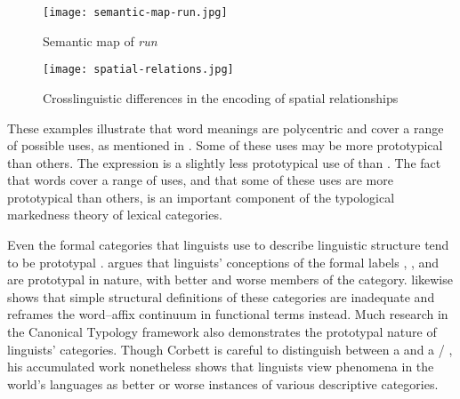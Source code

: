 \clearpage
  \begin{figure}[h!]
    \texttt{[image: semantic-map-run.jpg]}
    \caption[Semantic map of English \textit{run}]{Semantic map of  \textit{run} \parencite[74]{Gries2006}}
    \label{fig:semantic-map-run}
  \end{figure}
\clearpage

\begin{figure}[h!]
  \texttt{[image: spatial-relations.jpg]}
  \caption[Crosslinguistic differences in the encoding of spatial relationships]{Crosslinguistic differences in the encoding of spatial relationships \parencite[485]{BowermanChoi2001}}
  \label{fig:spatial-relations}
\end{figure}

These examples illustrate that word meanings are polycentric and cover a range of possible uses, as mentioned in . Some of these uses may be more prototypical than others. The  expression  is a slightly less prototypical use of  than . The fact that words cover a range of uses, and that some of these uses are more prototypical than others, is an important component of the typological markedness theory of lexical categories.

Even the formal categories that linguists use to describe linguistic structure tend to be prototypal \parencite[xii, 201]{Taylor2003}. \textcite[§11.1]{Taylor2003} argues that linguists' conceptions of the formal labels , , and  are prototypal in nature, with better and worse members of the category. \textcite{Haspelmath2005} likewise shows that simple structural definitions of these categories are inadequate and reframes the word–affix continuum in functional terms instead. Much research in the Canonical Typology framework \parencite{Corbett2005} also demonstrates the prototypal nature of linguists' categories. Though Corbett is careful to distinguish between a  and a  /  \parencite[142]{Corbett2010}, his accumulated work nonetheless shows that linguists view phenomena in the world's languages as better or worse instances of various descriptive categories.

